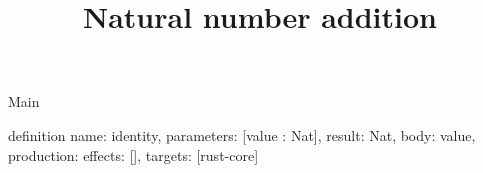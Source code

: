 \begin{lexlean}{Main}
\title{Natural number addition}
\begin{semanticmodule}
definition{
  name: identity,
  parameters: [value : Nat],
  result: Nat,
  body: value,
  production: {effects: [], targets: [rust-core]}
}
\end{semanticmodule}
\end{lexlean}
